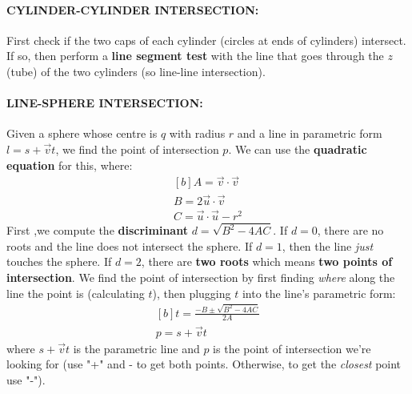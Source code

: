 \documentclass{article}
\begin{document}
\paragraph{}

\paragraph{{CYLINDER-CYLINDER INTERSECTION: }} First check if the two caps of each cylinder (circles at ends of cylinders) intersect. If so, then perform a \textbf{line segment test} with the line that goes through the $z$ (tube) of the two cylinders (so line-line intersection).
\paragraph{}

\paragraph{{LINE-SPHERE INTERSECTION: }}Given a sphere whose centre is $q$ with radius $r$ and a line in parametric form $l = s + \vec{v}t$, we find the point of intersection $p$. We can use the \textbf{quadratic equation} for this, where:
\begin{equation}
\begin{aligned}[b]
	A = \vec{v} \cdot \vec{v} \\
	B = 2 \vec{u} \cdot \vec{v} \\
	C = \vec{u} \cdot \vec{u} - r^2
\end{aligned}
\end{equation}
First ,we compute the \textbf{discriminant} $d = \sqrt{B^2 - 4AC}$. If $d = 0$, there are no roots and the line does not intersect the sphere. If $d = 1$, then the line \textit{just} touches the sphere. If $d = 2$, there are \textbf{two roots} which means \textbf{two points of intersection}. We find the point of intersection by first finding \textit{where} along the line the point is (calculating $t$), then plugging $t$ into the line's parametric form:
\begin{equation}
\begin{aligned}[b]
	t = \frac{-B \pm \sqrt{B^2 - 4AC}}{2A} \\
	p = s + \vec{v}t
	\label{eq:line-sphere-intersection}
\end{aligned}
\end{equation}
where $s + \vec{v}t$ is the parametric line and $p$ is the point of intersection we're looking for (use "+" and - to get both points. Otherwise, to get the \textit{closest} point use "-").
\end{document}
